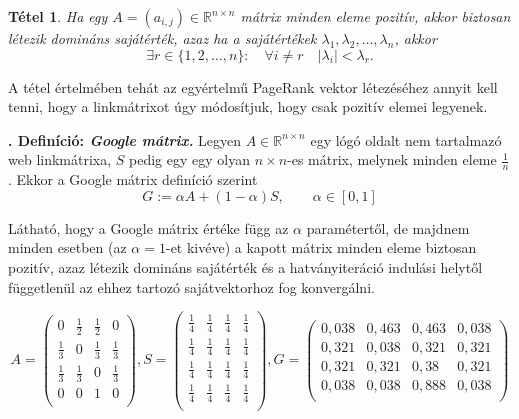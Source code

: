 \documentclass[12pt,a4paper]{article}
\newcounter{definicioszam}
\newenvironment{definicio}[1]
{{\medskip}\noindent \stepcounter{definicioszam}
{\bfseries{\thedefinicioszam. Definíció: \textit{#1.}}}}{\bigskip }
\newtheorem{tetel}{Tétel}
\begin{document}
\begin{tetel} Ha egy $A = (a_{i,j}) \in \mathbb{R}^{n \times n}$ mátrix minden eleme pozitív, akkor biztosan létezik domináns sajátérték, azaz ha a sajátértékek $\lambda_1 , \lambda_2 ,\ldots, \lambda_n$, akkor
\[ \exists r \in \{1,2,\ldots,n\}: \quad \forall i \neq r \quad |\lambda_i| < \lambda_r.  \]
\end{tetel}

A tétel értelmében tehát az egyértelmű PageRank vektor létezéséhez annyit kell tenni, hogy a linkmátrixot úgy módosítjuk, hogy csak pozitív elemei legyenek.

\begin{definicio}{Google mátrix}
	Legyen $A \in \mathbb{R}^{n \times n}$ egy lógó oldalt nem tartalmazó web linkmátrixa, $S$ pedig egy egy olyan $n \times n$-es mátrix, melynek minden eleme $\frac{1}{n}$. Ekkor a Google mátrix definíció szerint
	\[ G := \alpha A + (1-\alpha) S, \qquad \alpha \in [0,1] \]
\end{definicio}
\vspace{-1cm}

Látható, hogy a Google mátrix értéke függ az $\alpha$ paramétertől, de majdnem minden esetben (az $\alpha = 1$-et kivéve) a kapott mátrix minden eleme biztosan pozitív, azaz létezik domináns sajátérték és a hatványiteráció indulási helytől függetlenül az ehhez tartozó sajátvektorhoz fog konvergálni.

\[A =
\begin{pmatrix}
0 & \frac{1}{2} & \frac{1}{2} & 0 \\
\frac{1}{3} & 0 & \frac{1}{3} & \frac{1}{3} \\
\frac{1}{3} & \frac{1}{3} & 0 & \frac{1}{3} \\
0 & 0 & 1 & 0 \\
\end{pmatrix},
S =
\begin{pmatrix}
\frac{1}{4} & \frac{1}{4} & \frac{1}{4} & \frac{1}{4} \\
\frac{1}{4} & \frac{1}{4} & \frac{1}{4} & \frac{1}{4} \\
\frac{1}{4} & \frac{1}{4} & \frac{1}{4} & \frac{1}{4} \\
\frac{1}{4} & \frac{1}{4} & \frac{1}{4} & \frac{1}{4} \\
\end{pmatrix},
G =
\begin{pmatrix}
0,\!038 & 0,\!463 & 0,\!463 & 0,\!038 \\
0,\!321 & 0,\!038 & 0,\!321 & 0,\!321 \\
0,\!321 & 0,\!321 & 0,\!38 & 0,\!321 \\
0,\!038 & 0,\!038 & 0,\!888 & 0,\!038 \\
\end{pmatrix}
\]
\end{document}
